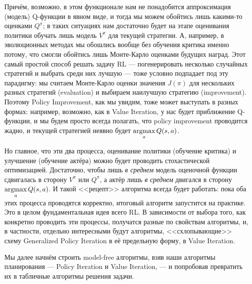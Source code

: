 Причём, возможно, в этом функционале нам не понадобится аппроксимация (модель) Q-функции в явном виде, и тогда мы можем обойтись лишь какими-то оценками $Q^{\pi}$; в таких ситуациях нам достаточно будет на этапе оценивания политики обучать лишь модель $V^{\pi}$ для текущей стратегии. А, например, в эволюционных методах мы обошлись вообще без обучения критика именно потому, что смогли обойтись лишь Монте-Карло оценками будущих наград. Этот самый простой способ решать задачу RL --- погенерировать несколько случайных стратегий и выбрать среди них лучшую --- тоже условно подпадает под эту парадигму: мы считаем Монте-Карло оценки значения $J(\pi)$ для нескольких разных стратегий (evaluation) и выбираем наилучшую стратегию (improvement). Поэтому Policy Improvement, как мы увидим, тоже может выступать в разных формах: например, возможно, как в Value Iteration, у нас будет приближение Q-функции, и мы будем просто всегда полагать, что policy improvement проводится жадно, и текущей стратегией неявно будет $\mathop{\mathrm{argmax}}\limits_a Q(s, a)$.

Но главное, что эти два процесса, оценивание политики (обучение критика) и улучшение (обучение актёра) можно будет проводить стохастической оптимизацией. Достаточно, чтобы лишь \textit{в среднем} модель оценочной функции сдвигалась в сторону $V^{\pi}$ или $Q^{\pi}$, а актёр лишь \textit{в среднем} двигался в сторону $\mathop{\mathrm{argmax}}\limits_a Q(s, a)$. И такой <<рецепт>> алгоритма всегда будет работать: пока оба этих процесса проводятся корректно, итоговый алгоритм запустится на практике. Это в целом фундаментальная идея всего RL. В зависимости от выбора того, как конкретно проводить эти процессы, получатся разные по свойствам алгоритмы, и, в частности, отдельно интересными будут алгоритмы, <<схлопывающие>> схему Generalized Policy Iteration в её предельную форму, в Value Iteration. 

Мы далее начнём строить model-free алгоритмы, взяв наши алгоритмы планирования --- Policy Iteration и Value Iteration, --- и попробовав превратить их в табличные алгоритмы решения задачи.


